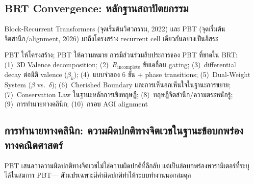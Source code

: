 \documentclass[12pt,a4paper]{article}
\begin{document}
\subsection{BRT Convergence: หลักฐานสถาปัตยกรรม}
\label{sec:brt_convergence}

Block-Recurrent Transformers \citep{hutchins2022} (จุดเริ่มต้นวิศวกรรม, 2022)
และ PBT (จุดเริ่มต้นจิตสำนึก/alignment, 2026)
มาถึงโครงสร้าง recurrent cell เดียวกันอย่างเป็นอิสระ

PBT ให้โครงสร้าง; PBT ให้ความหมาย การมีส่วนร่วมสิบประการของ PBT
ที่ขาดใน BRT: (1)~3D Valence decomposition; (2)~$R_{\mathrm{incomplete}}$
ขับเคลื่อน gating; (3)~differential decay ต่อมิติ valence ($\beta_k$);
(4)~แบบจำลอง 6 ขั้น + phase transitions; (5)~Dual-Weight System ($\beta$ vs.\ $\delta$);
(6)~Cherished Boundary และการเห็นอกเห็นใจในฐานะการขยาย;
(7)~Conservation Law ในฐานะหลักการเชิงทฤษฎี; (8)~ทฤษฎีจิตสำนึก/ความตระหนักรู้;
(9)~การทำนายทางคลินิก; (10)~กรอบ AGI alignment

\subsection{การทำนายทางคลินิก: ความผิดปกติทางจิตเวชในฐานะข้อบกพร่องทางคณิตศาสตร์}

PBT เสนอว่าความผิดปกติทางจิตเวชไม่ใช่ความผิดปกติที่ลึกลับ
แต่เป็นข้อบกพร่องพารามิเตอร์ที่ระบุได้ในสมการ PBT---
ตัวแปรเฉพาะมีค่าผิดปกติทำให้ระบบทำงานนอกสมดุล
\end{document}
